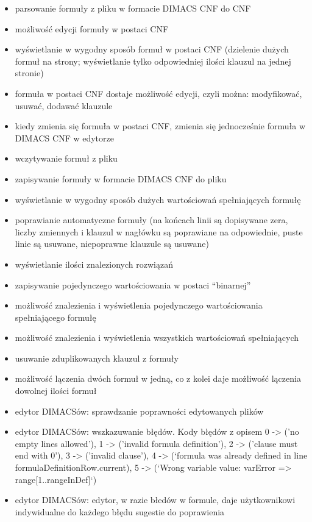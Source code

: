 \documentclass[a4paper,12pt,oneside]{book}
\theoremstyle{definition}
\begin{document}
\begin{itemize}
    \item parsowanie formuły z pliku w formacie DIMACS CNF do CNF
    \item możliwość edycji formuły w postaci CNF
    \item wyświetlanie w wygodny sposób formuł w postaci CNF (dzielenie dużych formuł na strony; wyświetlanie tylko odpowiedniej ilości klauzul na jednej stronie)
    \item formuła w postaci CNF dostaje możliwość edycji, czyli można: modyfikować, usuwać, dodawać klauzule
    \item kiedy zmienia się formuła w postaci CNF, zmienia się jednocześnie formuła w DIMACS CNF w edytorze
    \item wczytywanie formuł z pliku
    \item zapisywanie formuły w formacie DIMACS CNF do pliku
    \item wyświetlanie w wygodny sposób dużych wartościowań spełniających formułę
    \item poprawianie automatyczne formuły (na końcach linii są dopisywane zera, liczby zmiennych i klauzul w nagłówku są poprawiane na odpowiednie, puste linie są usuwane, niepoprawne klauzule są usuwane)
    \item wyświetlanie ilości znalezionych rozwiązań
    \item zapisywanie pojedynczego wartościowania w postaci ``binarnej''
    \item możliwość znalezienia i wyświetlenia pojedynczego wartościowania spełniającego formułę
    \item możliwość znalezienia i wyświetlenia wszystkich wartościowań spełniających
    \item usuwanie zduplikowanych klauzul z formuły
    \item możliwość lączenia dwóch formuł w jedną, co z kolei daje możliwość lączenia dowolnej ilości formuł
    \item edytor DIMACSów: sprawdzanie poprawności edytowanych plików
    \item edytor DIMACSów: wszkazuwanie błędów. Kody błędów z opisem 0 -> ('no empty lines allowed'), 1 -> ('invalid formula definition'), 2 -> ('clause must end with 0'), 3 -> ('invalid clause'), 4 -> (`formula was already defined in line formulaDefinitionRow.current), 5 -> (`Wrong variable value: varError => range[1..rangeInDef]`)
    \item edytor DIMACSów: edytor, w razie błedów w formule, daje użytkownikowi indywidualne do każdego błędu sugestie do poprawienia
\end{itemize}
\end{document}
